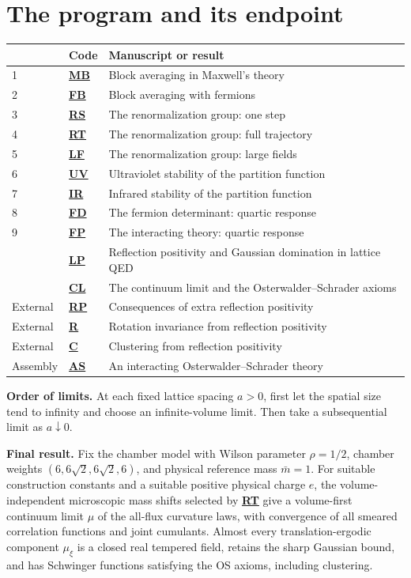 \documentclass[11pt]{article}
\newcommand{\Code}[1]{\hyperlink{block-#1}{\textbf{#1}}}
\begin{document}
\section*{The program and its endpoint}
\begin{center}
\small\renewcommand{\arraystretch}{1.18}
\begin{tabularx}{\textwidth}{@{}l l X@{}}
\toprule
& Code & Manuscript or result\\
\midrule
1 & \Code{MB} & Block averaging in Maxwell's theory\\
2 & \Code{FB} & Block averaging with fermions\\
3 & \Code{RS} & The renormalization group: one step\\
4 & \Code{RT} & The renormalization group: full trajectory\\
5 & \Code{LF} & The renormalization group: large fields\\
6 & \Code{UV} & Ultraviolet stability of the partition function\\
7 & \Code{IR} & Infrared stability of the partition function\\
8 & \Code{FD} & The fermion determinant: quartic response\\
9 & \Code{FP} & The interacting theory: quartic response\\
\midrule
& \Code{LP} & Reflection positivity and Gaussian domination in lattice QED\\
& \Code{CL} & The continuum limit and the Osterwalder--Schrader axioms\\
\midrule
External & \Code{RP} & Consequences of extra reflection positivity\\
External & \Code{R} & Rotation invariance from reflection positivity\\
External & \Code{C} & Clustering from reflection positivity\\
\midrule
Assembly & \Code{AS} & An interacting Osterwalder--Schrader theory\\
\bottomrule
\end{tabularx}
\end{center}
\textbf{Order of limits.}
At each fixed lattice spacing \(a>0\), first let the spatial size tend to
infinity and choose an infinite-volume limit. Then take a subsequential
limit as \(a\downarrow0\).

\textbf{Final result.}
Fix the chamber model with Wilson parameter \(\rho=1/2\), chamber
weights \((6,6\sqrt2,6\sqrt2,6)\), and physical reference mass
\(\bar m=1\). For suitable construction constants and a suitable
positive physical charge \(e\), the volume-independent microscopic
mass shifts selected by \Code{RT} give a volume-first continuum
limit \(\mu\) of the all-flux curvature laws, with convergence of
all smeared correlation functions and joint cumulants.
Almost every translation-ergodic component \(\mu_\xi\) is a closed
real tempered field, retains the sharp Gaussian bound, and has
Schwinger functions satisfying the OS axioms, including clustering.
\end{document}
